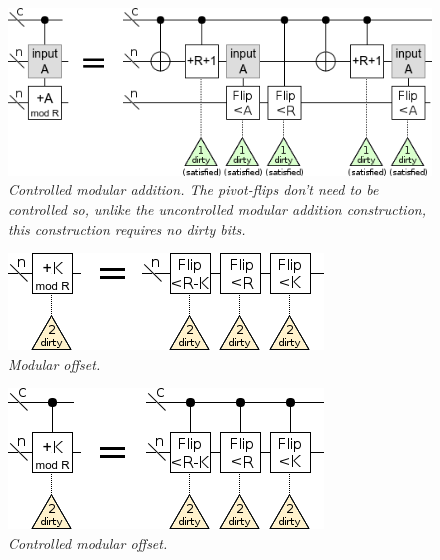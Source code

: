 \documentclass[twocolumn]{article}
\begin{document}
\begin{figure}
  \centering
  \includegraphics[width=\linewidth]{assets/controlled-modular-addition.png}
  \caption{\em
    Controlled modular addition.
    The pivot-flips don't need to be controlled so, unlike the uncontrolled modular addition construction, this construction requires no dirty bits.
  }
  \label{fig:controlled-modular-add}
\end{figure}

\begin{figure}
  \centering
  \includegraphics[width=\linewidth]{assets/modular-offset.png}
  \caption{\em Modular offset.}
  \label{fig:modular-offset}
\end{figure}

\begin{figure}
  \centering
  \includegraphics[width=\linewidth]{assets/controlled-modular-offset.png}
  \caption{\em
    Controlled modular offset.
  }
  \label{fig:controlled-modular-offset}
\end{figure}
\end{document}
